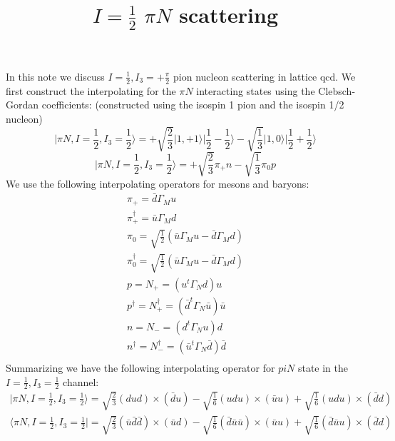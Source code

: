 \documentclass{article}[12pt]
\title{$I=\frac{1}{2}$ $\pi N$ scattering}
\begin{document}
\maketitle
In this note we discuss $I=\frac{1}{2},I_3=+\frac{\pi}{2}$ pion nucleon 
scattering in lattice qcd. We first construct the interpolating
for the $\pi N$ interacting states using the Clebsch-Gordan coefficients:
(constructed using the isospin 1 pion and the isospin 1/2 nucleon)
\begin{equation}
\vert \pi N, I=\frac{1}{2},I_{3}=\frac{1}{2}\rangle=+\sqrt{\frac{2}{3}}\vert 1,+1\rangle\vert \frac{1}{2} -\frac{1}{2}\rangle
                                                   -\sqrt{\frac{1}{3}}\vert 1, 0\rangle\vert \frac{1}{2} +\frac{1}{2}\rangle
\end{equation}
\begin{equation}
\vert \pi N, I=\frac{1}{2},I_{3}=\frac{1}{2}\rangle=+\sqrt{\frac{2}{3}}\pi_+ n
                                                   -\sqrt{\frac{1}{3}}\pi_0 p
\end{equation}
We use the following interpolating operators for mesons and baryons:
\begin{eqnarray}
\pi_+=\bar{d}\Gamma_M u \\
\pi_+^{\dagger}=\bar{u}\Gamma_M d\\
\pi_0=\sqrt{\frac{1}{2}}\left(\bar{u}\Gamma_M u-\bar{d}\Gamma_M d\right)\\
\pi_0^{\dagger}=\sqrt{\frac{1}{2}}\left(\bar{u}\Gamma_M u-\bar{d}\Gamma_M d\right)\\
p=N_{+}=(u^t\Gamma_N d)u \\
p^{\dagger}=N_{+}^{\dagger}=(\bar{d}^t\Gamma_N\bar{u})\bar{u}\\
n=N_{-}=(d^t\Gamma_N u)d \\
n^{\dagger}=N_{-}^{\dagger}=(\bar{u}^t\Gamma_N\bar{d})\bar{d}\\
\end{eqnarray}
Summarizing we have the following interpolating operator
for $piN$ state in the $I=\frac{1}{2},I_3=\frac{1}{2}$ channel:
\begin{eqnarray}
\vert\pi N,I=\frac{1}{2},I_3=\frac{1}{2}\rangle =
\sqrt{\frac{2}{3}}(dud)\times(\bar{d}u)-\sqrt{\frac{1}{6}}(udu)\times(\bar{u}u)+
\sqrt{\frac{1}{6}}(udu)\times(\bar{d}d)\\
\langle \pi N,I=\frac{1}{2},I_3=\frac{1}{2}\vert =
\sqrt{\frac{2}{3}}(\bar{u}\bar{d}\bar{d})\times(\bar{u}d)-\sqrt{\frac{1}{6}}(\bar{d}\bar{u}\bar{u})\times(\bar{u}u)+
\sqrt{\frac{1}{6}}(\bar{d}\bar{u}u)\times(\bar{d}d)
\end{eqnarray}
\end{document}
